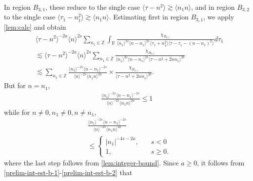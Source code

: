 \documentclass[12pt,reqno]{amsart}
\numberwithin{equation}{section}  %
\numberwithin{figure}{section}
\newcommand{\rr}{\mathbb{R}}
\newcommand{\zz}{\mathbb{Z}}
\theoremstyle{plain}
\theoremstyle{definition}
\theoremstyle{remark}
\begin{document}
In region $B_{3,1}$, these reduce to the single case $ \langle \tau - n^{2} \rangle
\gtrsim \langle n_{1}n \rangle$, and in region $B_{3,2}$ to the single
case $ \langle \tau_{1} - n_{1}^{2} \rangle
\gtrsim \langle n_{1}n \rangle$. Estimating first in region
$B_{3,1}$, we apply \autoref{lem:calc} and obtain
%
%
%
%
\begin{equation}
  \label{region-b31}
\begin{split}
& \langle \tau - n^{2}  \rangle ^{-2a} \langle n
    \rangle ^{2s}
    \sum_{n_{1} \in \zz} \int_{\rr} \frac{\chi_{B_{3,1}}}{ \langle n_{1} \rangle ^{2s} \langle n-n_{1} \rangle ^{2s} 
\langle \tau_{1} + n_{1}^{2}  \rangle \langle  \tau - \tau_{1} - (n -
n_{1})^{2}  \rangle}
d \tau_1 
\\
& \lesssim \langle \tau - n^{2} \rangle ^{-2a} \langle n \rangle ^{2s}
\sum_{n_{1} \in
\zz}  \frac{\chi_{B_{3,1}}}{\langle n_{1} \rangle ^{2s} \langle n - n_{1} \rangle
^{2s} \langle \tau - n^{2} + 2nn_{1}  \rangle ^{2b}}
\\
& \lesssim 
\sum_{n_{1} \in
\zz}  \frac{\langle n_1 \rangle ^{-2s} \langle n - n_{1} \rangle ^{-2s}}{\langle
n \rangle ^{-2s} \langle n_{1}n \rangle
^{2a}} \times \frac{\chi_{B_{3,1}}}{\langle \tau - n^{2} + 2nn_{1}
\rangle ^{2b}}.
\end{split}
\end{equation}
%
%
But for $n = n_{1}$, 
%
%
\begin{equation}
  \label{prelim-int-est-b-1}
\begin{split}
\frac{\langle n_1 \rangle ^{-2s} \langle n - n_{1} \rangle ^{-2s}}{\langle
n \rangle ^{-2s} \langle n_{1}n \rangle
^{2a}} \le 1
\end{split}
\end{equation}
while for $n \neq 0, n_{1} \neq 0, n \neq n_{1}$, 
\begin{equation}
  \begin{split}
  \label{prelim-int-est-b-2}
& \frac{\langle n_1 \rangle ^{-2s} \langle n - n_{1} \rangle ^{-2s}}{\langle
n \rangle ^{-2s} \langle n_{1}n \rangle
^{2a}} 
\\
& \le \begin{cases}
  | n_{1} |^{-4s-2a} , \quad & s < 0
\\
1, \quad  & s \ge 0. 
\end{cases}
\end{split}
\end{equation}
%
%
where the last step follows from \autoref{lem:integer-bound}. Since $a \ge 0$,
it follows from \eqref{prelim-int-est-b-1}-\eqref{prelim-int-est-b-2} that 
\end{document}
